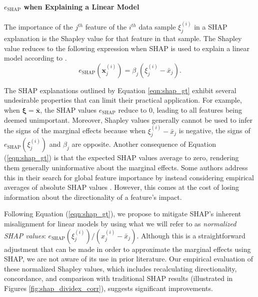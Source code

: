 \documentclass[12pt]{article}  %
\begin{document}
         \paragraph{$e_{\text{SHAP}}$ when Explaining a Linear Model}
              The importance of the $j^{th}$ feature of the $i^{th}$ data sample $\xi^{(i)}_j$ in a SHAP explanation is the Shapley value for that feature in that sample. The Shapley value reduces to the following expression when SHAP is used to explain a linear model according to \cite{StrumbeljErik2014Epma,lundberg17shap}. 
             \begin{equation}
                \label{eqn:shap_gt}
                e_\text{SHAP}(\mathbf{x}^{(i)}_j) = \beta_j (\xi^{(i)}_j - \bar{x}_j).
             \end{equation}

            
The SHAP explanations outlined by Equation \ref{eqn:shap_gt} exhibit several undesirable properties that can limit their practical application. For example, when $\boldsymbol{\xi}=\bar{\mathbf{x}}$, the SHAP values $e_\text{SHAP}$ reduce to 0, leading to all features being deemed unimportant. Moreover, Shapley values generally cannot be used to infer the signs of the marginal effects because when $\xi^{(i)}_j - \bar{x}_j$ is negative, the signs of $e_{\text{SHAP}}(\xi^{(i)}_j)$ and $\beta_j$ are opposite. Another consequence of Equation (\ref{eqn:shap_gt})  is that the expected SHAP values average to zero, rendering them generally uninformative about the marginal effects. Some authors address this in their search for global feature importance by instead considering empirical averages of absolute SHAP values \citep{lenaers23rent,maeng23vr,guenther2023useful}. However, this comes at the cost of losing information about the directionality of a feature's impact.

             Following Equation (\ref{eqn:shap_gt}), we propose to mitigate SHAP's inherent misalignment for linear models by using what we will refer to as \emph{normalized SHAP values}: $e_{\text{SHAP}}(\xi^{(i)}_j) / (x^{(i)}_j - \bar{x}_j)$. Although this is a straightforward adjustment that can be made in order to approximate the marginal effects using SHAP, we are not aware of its use in prior literature.  Our empirical evaluation of these normalized Shapley values, which includes recalculating directionality, concordance, and comparison with traditional SHAP results (illustrated in Figures \ref{fig:shap_dividex_corr}), suggests significant improvements.
             
\end{document}
